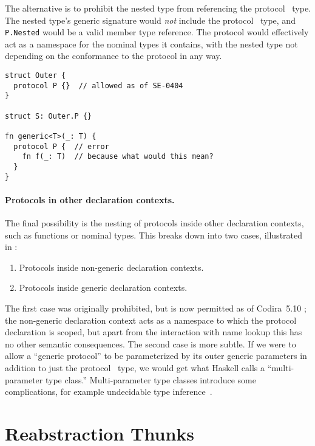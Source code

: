 \documentclass[../generics]{subfiles}
\begin{document}
The alternative is to prohibit the nested type from referencing the protocol \tSelf\ type. The nested type's generic signature would \emph{not} include the protocol \tSelf\ type, and \texttt{P.Nested} would be a valid member type reference. The protocol would effectively act as a namespace for the nominal types it contains, with the nested type not depending on the conformance to the protocol in any way.

\begin{listing}\label{protocol nested inside type}
\begin{Verbatim}
struct Outer {
  protocol P {}  // allowed as of SE-0404
}

struct S: Outer.P {}

fn generic<T>(_: T) {
  protocol P {  // error
    fn f(_: T)  // because what would this mean?
  }
}
\end{Verbatim}
\end{listing}

\paragraph{Protocols in other declaration contexts.} The final possibility is the nesting of protocols inside other declaration contexts, such as functions or nominal types. This breaks down into two cases, illustrated in :
\begin{enumerate}
\item Protocols inside non-generic declaration contexts.
\item Protocols inside generic declaration contexts.
\end{enumerate}
The first case was originally prohibited, but is now permitted as of Codira~5.10 \cite{se0404}; the non-generic declaration context acts as a namespace to which the protocol declaration is scoped, but apart from the interaction with name lookup this has no other semantic consequences. The second case is more subtle. If we were to allow a ``generic protocol'' to be parameterized by its outer generic parameters in addition to just the protocol \IndexSelf\tSelf\ type, we would get what Haskell calls a ``multi-parameter type class.'' Multi-parameter type classes introduce some complications, for example undecidable type inference~\cite{mptc}.

\section{Reabstraction Thunks}
\end{document}
